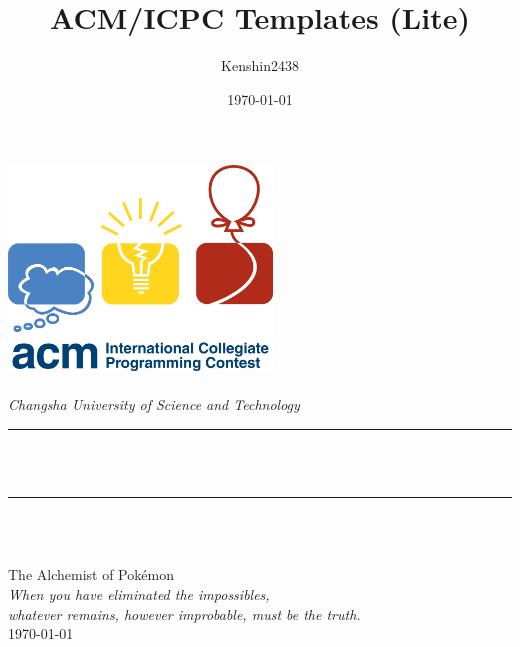 \title{ACM/ICPC Templates (Lite)}
\author{Kenshin2438}
\date{\today}

\begin{titlepage}
  \newcommand{\HRule}{\rule{\linewidth}{0.5mm}}
  \centering
  \includegraphics[width=7cm]{icpc.png}\\[1cm]
  \quad\\[1.5cm]
  \textsl{\Large Changsha University of Science and Technology }\\[0.5cm]
  \makeatletter
  \HRule \\[0.4cm]
  { \huge \bfseries \@title }\\[0.4cm]
  \HRule \\[1.5cm]
  \begin{minipage}{0.4\textwidth}
    \centering\large\@author
  \end{minipage}\\[3cm]
  \makeatother
  {\large The Alchemist of Pokémon}\\[2cm]
  {\large 
  \emph{When you have eliminated the impossibles, \\whatever remains, however improbable, must be the truth.}
  }\\[0.5cm]
  {\large \today}\\[2cm]
\end{titlepage}
